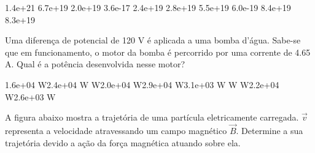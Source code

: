 \documentclass[12pt, addpoints]{exam}
\begin{document}
\begin{questions}
\begin{multicols*}{2}
\begin{oneparchoices}
\choice 1.4e+21 \choice 6.7e+19 \choice 2.0e+19 \choice 3.6e-17 \choice 2.4e+19 \choice 2.8e+19 \choice 5.5e+19 \choice 6.0e-19 \choice 8.4e+19 \choice 8.3e+19 
\end{oneparchoices}\question Uma diferença de potencial de 120 V é aplicada a uma bomba d’água. Sabe-se que em funcionamento, o motor da bomba é percorrido por uma corrente de    4.65 A. Qual é a potência desenvolvida nesse motor?

\begin{oneparchoices}
\choice 1.6e+04 W\choice 2.4e+04 W W\choice 2.0e+04 W\choice 2.9e+04 W\choice 3.1e+03 W W W\choice 2.2e+04 W\choice 2.6e+03 W
\end{oneparchoices}\question A ﬁgura abaixo mostra a trajetória de uma partícula eletricamente carregada. $\vec{{v}}$ representa a velocidade atravessando um campo magnético $\vec{{B}}$. Determine a sua trajetória devido a ação da força magnética atuando sobre ela.
        
        \begin{center}
            \begin{minipage}[c]{0.5\linewidth}
            \end{minipage}
        \end{center}

        


\end{multicols*}
\end{questions}
\end{document}
